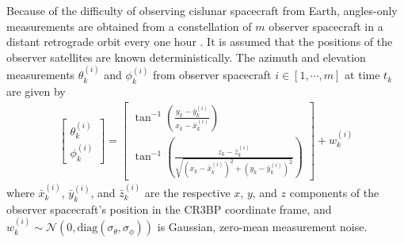 \documentclass[letterpaper, preprint, paper,11pt]{AAS}	%
\begin{document}
Because of the difficulty of observing cislunar spacecraft from Earth, angles-only measurements are obtained from a constellation of $m$ observer spacecraft in a distant retrograde orbit every one hour \cite{gupta2023constellation}. It is assumed that the positions of the observer satellites are known deterministically. The azimuth and elevation measurements $\theta_k^{(i)}$ and $\phi_k^{(i)}$ from observer spacecraft $i \in [1, \cdots, m]$ at time $t_k$ are given by
\begin{align}
    \begin{bmatrix}
        \theta_k^{(i)} \\
        \phi_k^{(i)}
    \end{bmatrix} = \begin{bmatrix}
        \tan^{-1}\left(\frac{y_k - \bar{y}_k^{(i)}}{x_k - \bar{x}_k^{(i)}}\right) \\
        \tan^{-1}\left(\frac{z_k - \bar{z}_k^{(i)}}{\sqrt{(x_k - \bar{x}_k^{(i)})^2 + (y_k - \bar{y}_k^{(i)})^2}}\right)
    \end{bmatrix} + w_k^{(i)}
\end{align}
\noindent where $\bar{x}_k^{(i)}$, $\bar{y}_k^{(i)}$, and $\bar{z}_k^{(i)}$ are the respective $x$, $y$, and $z$ components of the observer spacecraft's position in the CR3BP coordinate frame, and $w_k^{(i)} \sim \mathcal{N}(0, \text{diag}(\sigma_\theta, \sigma_\phi))$ is Gaussian, zero-mean measurement noise. 
\end{document}
